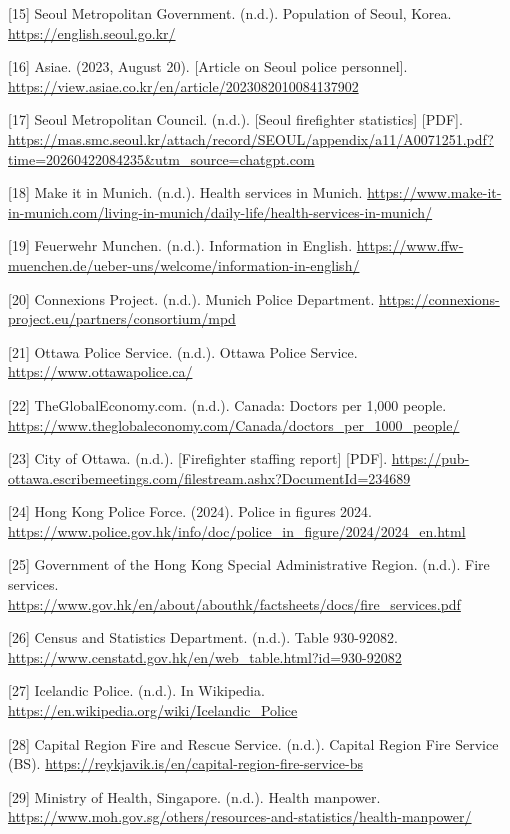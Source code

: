 \documentclass[11pt,letterpaper]{article}
\begin{document}
[15] Seoul Metropolitan Government. (n.d.). Population of Seoul, Korea. \url{https://english.seoul.go.kr/}


[16] Asiae. (2023, August 20). [Article on Seoul police personnel]. \url{https://view.asiae.co.kr/en/article/2023082010084137902}


[17] Seoul Metropolitan Council. (n.d.). [Seoul firefighter statistics] [PDF]. \url{https://mas.smc.seoul.kr/attach/record/SEOUL/appendix/a11/A0071251.pdf?time=20260422084235&utm_source=chatgpt.com}


[18] Make it in Munich. (n.d.). Health services in Munich. \url{https://www.make-it-in-munich.com/living-in-munich/daily-life/health-services-in-munich/}


[19] Feuerwehr Munchen. (n.d.). Information in English. \url{https://www.ffw-muenchen.de/ueber-uns/welcome/information-in-english/}


[20] Connexions Project. (n.d.). Munich Police Department. \url{https://connexions-project.eu/partners/consortium/mpd}


[21] Ottawa Police Service. (n.d.). Ottawa Police Service. \url{https://www.ottawapolice.ca/}


[22] TheGlobalEconomy.com. (n.d.). Canada: Doctors per 1,000 people. \url{https://www.theglobaleconomy.com/Canada/doctors_per_1000_people/}


[23] City of Ottawa. (n.d.). [Firefighter staffing report] [PDF]. \url{https://pub-ottawa.escribemeetings.com/filestream.ashx?DocumentId=234689}


[24] Hong Kong Police Force. (2024). Police in figures 2024. \url{https://www.police.gov.hk/info/doc/police_in_figure/2024/2024_en.html}


[25] Government of the Hong Kong Special Administrative Region. (n.d.). Fire services. \url{https://www.gov.hk/en/about/abouthk/factsheets/docs/fire_services.pdf}


[26] Census and Statistics Department. (n.d.). Table 930-92082. \url{https://www.censtatd.gov.hk/en/web_table.html?id=930-92082}


[27] Icelandic Police. (n.d.). In Wikipedia. \url{https://en.wikipedia.org/wiki/Icelandic_Police}


[28] Capital Region Fire and Rescue Service. (n.d.). Capital Region Fire Service (BS). \url{https://reykjavik.is/en/capital-region-fire-service-bs}


[29] Ministry of Health, Singapore. (n.d.). Health manpower. \url{https://www.moh.gov.sg/others/resources-and-statistics/health-manpower/}
\end{document}
